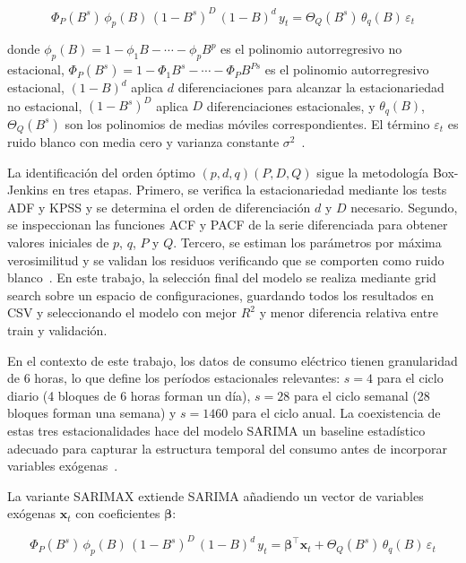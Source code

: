 \documentclass[12pt, a4paper]{article}
\begin{document}
\begin{equation}
\Phi_P(B^s)\,\phi_p(B)\,(1-B^s)^D\,(1-B)^d\, y_t = \Theta_Q(B^s)\,\theta_q(B)\,\varepsilon_t
\end{equation}

donde $\phi_p(B) = 1 - \phi_1 B - \cdots - \phi_p B^p$ es el polinomio autorregresivo no estacional, $\Phi_P(B^s) = 1 - \Phi_1 B^s - \cdots - \Phi_P B^{Ps}$ es el polinomio autorregresivo estacional, $(1-B)^d$ aplica $d$ diferenciaciones para alcanzar la estacionariedad no estacional, $(1-B^s)^D$ aplica $D$ diferenciaciones estacionales, y $\theta_q(B)$, $\Theta_Q(B^s)$ son los polinomios de medias móviles correspondientes. El término $\varepsilon_t$ es ruido blanco con media cero y varianza constante $\sigma^2$~\cite{hyndman2021}.

La identificación del orden óptimo $(p, d, q)(P, D, Q)$ sigue la metodología Box-Jenkins en tres etapas. Primero, se verifica la estacionariedad mediante los tests ADF y KPSS y se determina el orden de diferenciación $d$ y $D$ necesario. Segundo, se inspeccionan las funciones ACF y PACF de la serie diferenciada para obtener valores iniciales de $p$, $q$, $P$ y $Q$. Tercero, se estiman los parámetros por máxima verosimilitud y se validan los residuos verificando que se comporten como ruido blanco~\cite{hyndman2021, boxjenkins2015}. En este trabajo, la selección final del modelo se realiza mediante grid search sobre un espacio de configuraciones, guardando todos los resultados en CSV y seleccionando el modelo con mejor $R^2$ y menor diferencia relativa entre train y validación.

En el contexto de este trabajo, los datos de consumo eléctrico tienen granularidad de 6 horas, lo que define los períodos estacionales relevantes: $s = 4$ para el ciclo diario (4 bloques de 6 horas forman un día), $s = 28$ para el ciclo semanal (28 bloques forman una semana) y $s = 1460$ para el ciclo anual. La coexistencia de estas tres estacionalidades hace del modelo SARIMA un baseline estadístico adecuado para capturar la estructura temporal del consumo antes de incorporar variables exógenas~\cite{hyndman2021}.

La variante SARIMAX extiende SARIMA añadiendo un vector de variables exógenas $\mathbf{x}_t$ con coeficientes $\boldsymbol{\beta}$:

\begin{equation}
\Phi_P(B^s)\,\phi_p(B)\,(1-B^s)^D\,(1-B)^d\, y_t = \boldsymbol{\beta}^\top \mathbf{x}_t + \Theta_Q(B^s)\,\theta_q(B)\,\varepsilon_t
\end{equation}
\end{document}
